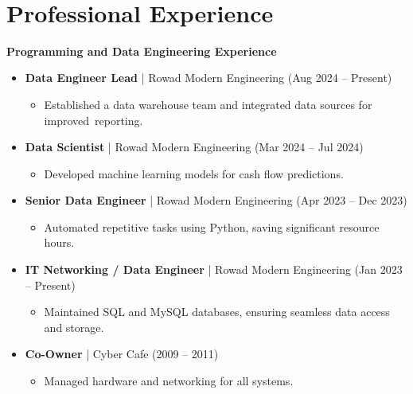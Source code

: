 \documentclass[10pt, letterpaper]{article}
\begin{document}
    \section{Professional Experience}
\textbf{\textcolor{primaryColor}{Programming and Data Engineering Experience}}
\begin{itemize}[leftmargin=*]
    \item \textbf{Data Engineer Lead} | Rowad Modern Engineering (Aug 2024 – Present)
    \begin{itemize}[leftmargin=1cm]
        \item Established a data warehouse team and integrated data sources for \mbox{improved reporting}.
    \end{itemize}
    \item \textbf{Data Scientist} | Rowad Modern Engineering (Mar 2024 – Jul 2024)
    \begin{itemize}[leftmargin=1cm]
        \item Developed machine learning models for cash flow predictions.
    \end{itemize}
    \item \textbf{Senior Data Engineer} | Rowad Modern Engineering (Apr 2023 – Dec 2023)
    \begin{itemize}[leftmargin=1cm]
        \item Automated repetitive tasks using Python, saving significant resource hours.
    \end{itemize}
    \item \textbf{IT Networking / Data Engineer} | Rowad Modern Engineering (Jan 2023 – Present)
    \begin{itemize}[leftmargin=1cm]
        \item Maintained SQL and MySQL databases, ensuring seamless data access and storage.
    \end{itemize}
    \item \textbf{Co-Owner} | Cyber Cafe (2009 – 2011)
    \begin{itemize}[leftmargin=1cm]
        \item Managed hardware and networking for all systems.
    \end{itemize}
\end{itemize}
\end{document}
